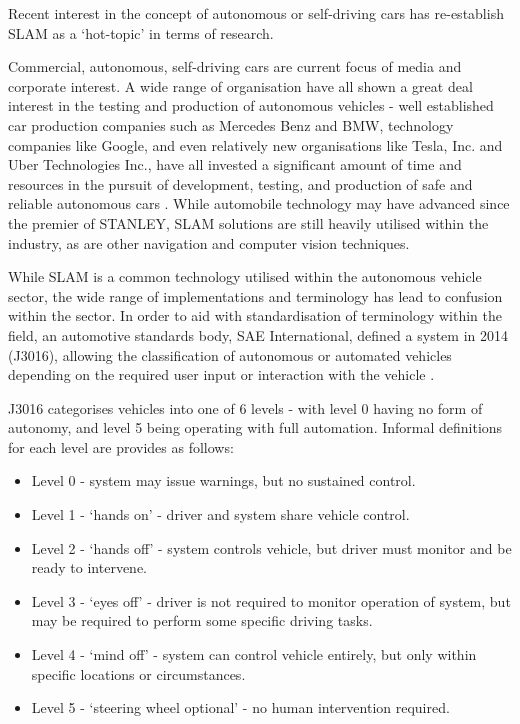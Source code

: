 Recent interest in the concept of autonomous or self-driving cars has
re-establish SLAM as a `hot-topic' in terms of research.

Commercial, autonomous, self-driving cars are current focus of media and
corporate interest.
A wide range of organisation have all shown a great deal interest in the testing
and production of autonomous vehicles - well established car production
companies such as Mercedes Benz and BMW, technology companies like Google, and
even relatively new organisations like Tesla, Inc. and Uber Technologies Inc.,
have all invested a significant amount of time and resources in the pursuit of
development, testing, and production of safe and reliable autonomous cars
\cite{waymo,tesla,uber,mercedes,bmw_2018}.
While automobile technology may have advanced since the premier of STANLEY,
SLAM solutions are still heavily utilised within the industry, as are other
navigation and computer vision techniques.

While SLAM is a common technology utilised within the autonomous vehicle
sector, the wide range of implementations and terminology has lead to confusion
within the sector.
In order to aid with standardisation of terminology within the field, an
automotive standards body, SAE International, defined a system in 2014
(J3016), allowing the classification of autonomous or automated vehicles
depending on the required user input or interaction with the vehicle
\cite{standard2014j3016}.

J3016 categorises vehicles into one of 6 levels - with level 0 having no form
of autonomy, and level 5 being operating with full automation.
Informal definitions for each level are provides as follows:

\begin{itemize}
\item Level 0 - system may issue warnings, but no sustained control.
\item Level 1 - `hands on' - driver and system share vehicle control.
\item Level 2 - `hands off' - system controls vehicle, but driver must monitor
                and be ready to intervene.
\item Level 3 - `eyes off' - driver is not required to monitor operation of
                system, but may be required to perform some specific driving tasks.
\item Level 4 - `mind off' - system can control vehicle entirely, but only
                within specific locations or circumstances.
\item Level 5 - `steering wheel optional' - no human intervention required.
\end{itemize}

